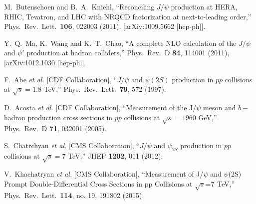 \documentclass[aps,prc,preprint,superscriptaddress,showpacs,showkeys,amsmath]{revtex4-1}
\begin{document}
\begin{thebibliography}{100}
  M.~Butenschoen and B.~A.~Kniehl,
  ``Reconciling $J/\psi$ production at HERA, RHIC, Tevatron, and LHC with NRQCD factorization at next-to-leading order,''
  Phys.\ Rev.\ Lett.\  {\bf 106}, 022003 (2011). 
[arXiv:1009.5662 [hep-ph]].
 

  Y.~Q.~Ma, K.~Wang and K.~T.~Chao,
  ``A complete NLO calculation of the $J/\psi$ and $\psi'$ production at hadron colliders,''
  Phys.\ Rev.\ D {\bf 84}, 114001 (2011),
  [arXiv:1012.1030 [hep-ph]].









  F.~Abe {\it et al.} [CDF Collaboration],
  ``$J/\psi$ and $\psi(2S)$ production in $p\bar{p}$ collisions at $\sqrt{s} = 1.8$ TeV,''
  Phys.\ Rev.\ Lett.\  {\bf 79}, 572 (1997).
  

  D.~Acosta {\it et al.}  [CDF Collaboration],
  ``Measurement of the J/$\psi$ meson and $b-$hadron production cross sections in $p\bar{p}$ collisions at $\sqrt{s} = 1960$ GeV,''
  Phys.\ Rev.\ D {\bf 71}, 032001 (2005).



  S.~Chatrchyan {\it et al.} [CMS Collaboration],
  ``$J/\psi$ and $\psi_{2S}$ production in $pp$ collisions at $\sqrt{s}=7$ TeV,''
  JHEP {\bf 1202}, 011 (2012).
  

  V.~Khachatryan {\it et al.} [CMS Collaboration],
  ``Measurement of J/$\psi$ and $\psi$(2S) Prompt Double-Differential Cross Sections in pp Collisions at $\sqrt{s}$=7  TeV,''
  Phys.\ Rev.\ Lett.\  {\bf 114}, no. 19, 191802 (2015).




\end{thebibliography}
\end{document}
